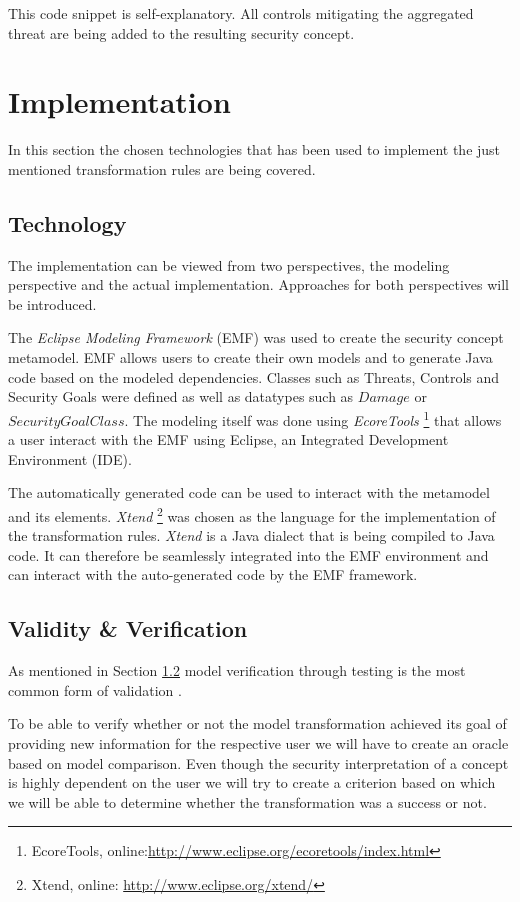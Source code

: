 This code snippet is self-explanatory. All controls mitigating the aggregated threat are being added to the resulting security concept.

\section{Implementation}

In this section the chosen technologies that has been used to implement the just mentioned transformation rules are being covered. 

\subsection{Technology}

The implementation can be viewed from two perspectives, the modeling perspective and the actual implementation. Approaches for both perspectives will be introduced.

The \textit{Eclipse Modeling Framework} (EMF) was used to create the security concept metamodel. EMF allows users to create their own models and to generate Java code based on the modeled dependencies. Classes such as Threats, Controls and Security Goals were defined as well as datatypes such as $Damage$ or $SecurityGoalClass$. The modeling itself was done using \textit{EcoreTools} \footnote{EcoreTools, online:\url{http://www.eclipse.org/ecoretools/index.html} } that allows a user interact with the EMF using Eclipse, an Integrated Development Environment (IDE).

The automatically generated code can be used to interact with the metamodel and its elements. \textit{Xtend} \footnote{Xtend, online: \url{http://www.eclipse.org/xtend/}} was chosen as the language for the implementation of the transformation rules. \textit{Xtend} is a Java dialect that is being compiled to Java code. It can therefore be seamlessly integrated into the EMF environment and can interact with the auto-generated code by the EMF framework.    

\subsection{Validity \& Verification}
\label{subsec:validation}

As mentioned in Section \ref{subsec:validation} model verification through testing is the most common form of validation \cite{fleurey}.

To be able to verify whether or not the model transformation achieved its goal of providing new information for the respective user we will have to create an oracle based on model comparison. Even though the security interpretation of a concept is highly dependent on the user we will try to create a criterion based on which we will be able to determine whether the transformation was a success or not.

